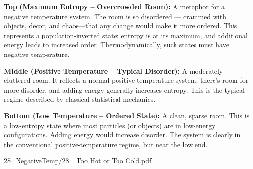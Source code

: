 \begin{SideNotePage}{
  \textbf{Top (Maximum Entropy – Overcrowded Room):}  
  A metaphor for a negative temperature system. The room is so disordered — crammed with objects, decor, and chaos—that any change would make it more ordered. This represents a population-inverted state: entropy is at its maximum, and additional energy leads to increased order. Thermodynamically, such states must have negative temperature. \par

  \textbf{Middle (Positive Temperature – Typical Disorder):}  
  A moderately cluttered room. It reflects a normal positive temperature system: there’s room for more disorder, and adding energy generally increases entropy. This is the typical regime described by classical statistical mechanics. \par

  \textbf{Bottom (Low Temperature – Ordered State):}  
  A clean, sparse room. This is a low-entropy state where most particles (or objects) are in low-energy configurations. Adding energy would increase disorder. The system is clearly in the conventional positive-temperature regime, but near the low end. \par

}{28_NegativeTemp/28_ Too Hot or Too Cold.pdf}
\end{SideNotePage}

